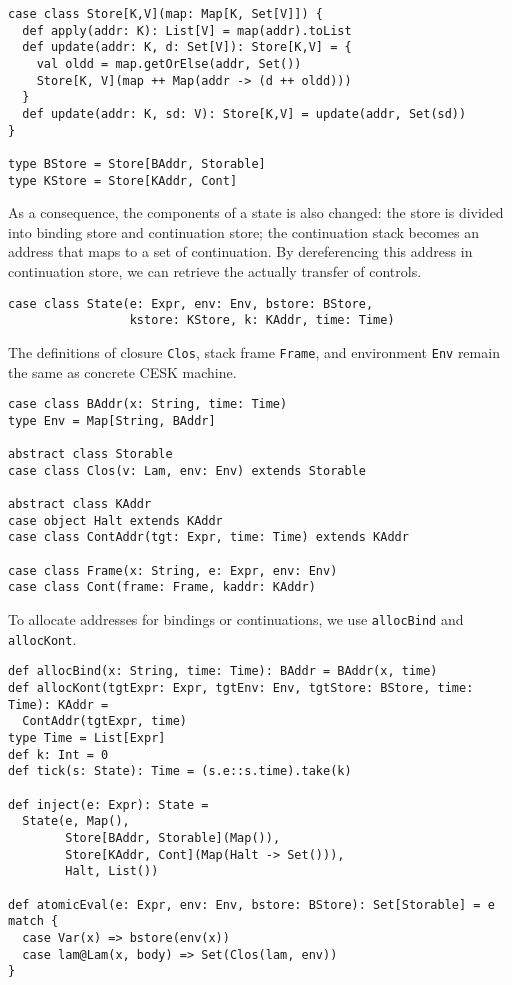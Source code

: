 \documentclass[acmsmall,review,anonymous]{acmart}\settopmatter{printfolios=true,printccs=false,printacmref=false}
\begin{document}
\begin{verbatim}
case class Store[K,V](map: Map[K, Set[V]]) {
  def apply(addr: K): List[V] = map(addr).toList
  def update(addr: K, d: Set[V]): Store[K,V] = {
    val oldd = map.getOrElse(addr, Set())
    Store[K, V](map ++ Map(addr -> (d ++ oldd)))
  }
  def update(addr: K, sd: V): Store[K,V] = update(addr, Set(sd))
}

type BStore = Store[BAddr, Storable]
type KStore = Store[KAddr, Cont]
\end{verbatim}

As a consequence, the components of a state is also changed: 
the store is divided into binding store and continuation store;
the continuation stack becomes an address that maps to a set of continuation.
By dereferencing this address in continuation store, we can retrieve the 
actually transfer of controls.

\begin{verbatim}
case class State(e: Expr, env: Env, bstore: BStore, 
                 kstore: KStore, k: KAddr, time: Time)
\end{verbatim}

The definitions of closure \texttt{Clos}, stack frame \texttt{Frame}, and 
environment \texttt{Env} remain the same as concrete CESK machine.

\begin{verbatim}
case class BAddr(x: String, time: Time)
type Env = Map[String, BAddr]

abstract class Storable 
case class Clos(v: Lam, env: Env) extends Storable

abstract class KAddr
case object Halt extends KAddr
case class ContAddr(tgt: Expr, time: Time) extends KAddr

case class Frame(x: String, e: Expr, env: Env)
case class Cont(frame: Frame, kaddr: KAddr)
\end{verbatim}

To allocate addresses for bindings or continuations, we use \texttt{allocBind}
and \texttt{allocKont}.

\begin{verbatim}
def allocBind(x: String, time: Time): BAddr = BAddr(x, time)
def allocKont(tgtExpr: Expr, tgtEnv: Env, tgtStore: BStore, time: Time): KAddr = 
  ContAddr(tgtExpr, time)
type Time = List[Expr]
def k: Int = 0
def tick(s: State): Time = (s.e::s.time).take(k)

def inject(e: Expr): State = 
  State(e, Map(), 
        Store[BAddr, Storable](Map()), 
        Store[KAddr, Cont](Map(Halt -> Set())), 
        Halt, List())

def atomicEval(e: Expr, env: Env, bstore: BStore): Set[Storable] = e match {
  case Var(x) => bstore(env(x))
  case lam@Lam(x, body) => Set(Clos(lam, env))
}
\end{verbatim}
\end{document}
